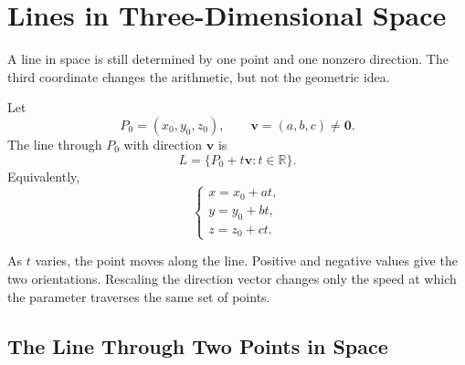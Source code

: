 \section{Lines in Three-Dimensional Space}

\begin{corebox}
A line in space is still determined by one point and one nonzero direction. The
third coordinate changes the arithmetic, but not the geometric idea.
\end{corebox}

\begin{definitionbox}
Let
\[
P_0=(x_0,y_0,z_0),
\qquad
\mathbf v=(a,b,c)\neq\mathbf0.
\]
The line through $P_0$ with direction $\mathbf v$ is
\[
\boxed{L=\{P_0+t\mathbf v:t\in\mathbb R\}}.
\]
Equivalently,
\[
\boxed{
\begin{cases}
x=x_0+at,\\
y=y_0+bt,\\
z=z_0+ct.
\end{cases}
}
\]
\end{definitionbox}

\begin{interpretationbox}
As $t$ varies, the point moves along the line. Positive and negative values give
the two orientations. Rescaling the direction vector changes only the speed at
which the parameter traverses the same set of points.
\end{interpretationbox}

\begin{center}
\end{center}

\subsection{The Line Through Two Points in Space}

